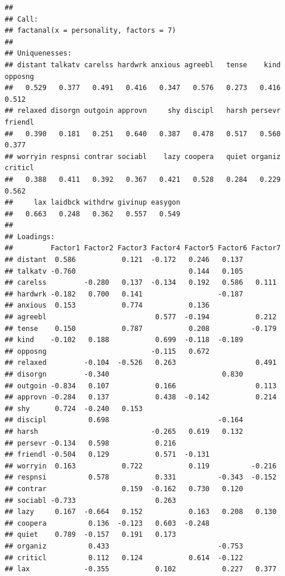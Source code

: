 \documentclass[]{book}
\begin{document}
\begin{verbatim}
## 
## Call:
## factanal(x = personality, factors = 7)
## 
## Uniquenesses:
## distant talkatv carelss hardwrk anxious agreebl   tense    kind opposng 
##   0.529   0.377   0.491   0.416   0.347   0.576   0.273   0.416   0.512 
## relaxed disorgn outgoin approvn     shy discipl   harsh persevr friendl 
##   0.390   0.181   0.251   0.640   0.387   0.478   0.517   0.560   0.377 
## worryin respnsi contrar sociabl    lazy coopera   quiet organiz criticl 
##   0.388   0.411   0.392   0.367   0.421   0.528   0.284   0.229   0.562 
##     lax laidbck withdrw givinup easygon 
##   0.663   0.248   0.362   0.557   0.549 
## 
## Loadings:
##         Factor1 Factor2 Factor3 Factor4 Factor5 Factor6 Factor7
## distant  0.586           0.121  -0.172   0.246   0.137         
## talkatv -0.760                           0.144   0.105         
## carelss         -0.280   0.137  -0.134   0.192   0.586   0.111 
## hardwrk -0.182   0.700   0.141                  -0.187         
## anxious  0.153           0.774           0.136                 
## agreebl                          0.577  -0.194           0.212 
## tense    0.150           0.787           0.208          -0.179 
## kind    -0.102   0.188           0.699  -0.118  -0.189         
## opposng                         -0.115   0.672                 
## relaxed         -0.104  -0.526   0.263                   0.491 
## disorgn         -0.340                           0.830         
## outgoin -0.834   0.107           0.166                   0.113 
## approvn -0.284   0.137           0.438  -0.142           0.214 
## shy      0.724  -0.240   0.153                                 
## discipl          0.698                          -0.164         
## harsh                           -0.265   0.619   0.132         
## persevr -0.134   0.598           0.216                         
## friendl -0.504   0.129           0.571  -0.131                 
## worryin  0.163           0.722           0.119          -0.216 
## respnsi          0.578           0.331          -0.343  -0.152 
## contrar                  0.159  -0.162   0.730   0.120         
## sociabl -0.733                   0.263                         
## lazy     0.167  -0.664   0.152           0.163   0.208   0.130 
## coopera          0.136  -0.123   0.603  -0.248                 
## quiet    0.789  -0.157   0.191   0.173                         
## organiz          0.433                          -0.753         
## criticl          0.112   0.124           0.614  -0.122         
## lax             -0.355           0.102           0.227   0.377 

\end{verbatim}
\end{document}
